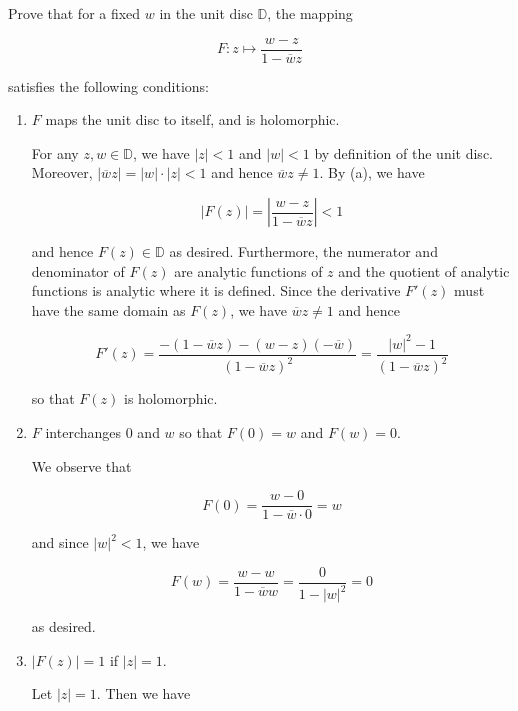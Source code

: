 Prove that for a fixed $w$ in the unit disc $\mathbb{D}$, the mapping

$$
F: z \mapsto \frac{w - z}{1 - \overline{w}z}
$$

satisfies the following conditions:

\begin{enumerate}
    \item $F$ maps the unit disc to itself, and is holomorphic.

    \begin{solution}
        For any $z, w \in \mathbb{D}$, we have $|z| < 1$ and $|w| < 1$ by definition of the unit disc. Moreover, 
        $|\overline{w} z| = |w| \cdot |z| < 1$ and hence $\overline {w} z \neq 1$. By (a), we have

        $$
        |F(z)| = \left| \frac{w - z}{1 - \overline{w}z} \right| < 1
        $$

        and hence $F(z) \in \mathbb{D}$ as desired. Furthermore, the numerator and denominator of $F(z)$ are analytic 
        functions of $z$ and the quotient of analytic functions is analytic where it is defined. Since the derivative 
        $F'(z)$ must have the same domain as $F(z)$, we have $\overline{w} z \neq 1$ and hence

        $$
            F'(z) = \frac{-(1 - \overline{w}z) - (w - z)(-\overline{w})}{(1 - \overline{w}z)^2} = \frac{|w|^2 - 1}{(1 - \overline{w}z)^2} 
        $$

        so that $F(z)$ is holomorphic.
    \end{solution}

    \item $F$ interchanges $0$ and $w$ so that $F(0) = w$ and $F(w) = 0$.
    
    \begin{solution}
        We observe that

        $$
            F(0) = \frac{w - 0}{1 - \overline{w} \cdot 0} = w
        $$

        and since $|w|^2 < 1$, we have

        $$
            F(w) = \frac{w - w}{1 - \overline{w} w} = \frac{0}{1 - |w|^2} = 0
        $$

        as desired.
    \end{solution}

    \pagebreak
    \item $\left| F(z) \right| = 1$ if $\left| z \right| = 1$.
    
    \begin{solution}
        Let $|z| = 1$. Then we have


\end{solution}
\end{enumerate}
